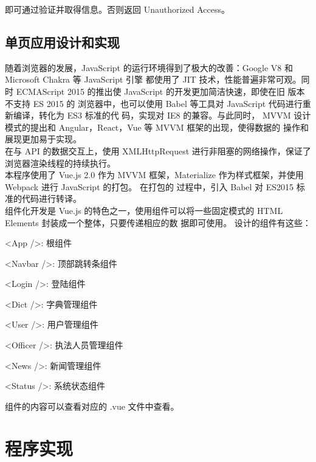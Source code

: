 \documentclass[a4paper, 12pt]{article}
\begin{document}
	即可通过验证并取得信息。否则返回 Unauthorized Access。

	\subsection{\normalfont 单页应用设计和实现}

	随着浏览器的发展，JavaScript 的运行环境得到了极大的改善：Google V8 和 Microsoft Chakra 等 JavaScript 引擎
	都使用了 JIT 技术，性能普遍非常可观。同时 ECMAScript 2015 的推出使 JavaScript 的开发更加简洁快速，即使在旧
	版本不支持 ES 2015 的 浏览器中，也可以使用 Babel 等工具对 JavaScript 代码进行重新编译，转化为 ES3 标准的代
	码，实现对 IE8 的兼容。与此同时， MVVM 设计模式的提出和 Angular，React，Vue 等 MVVM 框架的出现，使得数据的
	操作和展现更加易于实现。 \\

	在与 API 的数据交互上，使用 XMLHttpRequest 进行非阻塞的网络操作，保证了浏览器渲染线程的持续执行。 \\

	本程序使用了 Vue.js 2.0 作为 MVVM 框架，Materialize 作为样式框架，并使用 Webpack 进行 JavaScript 的打包。
	在打包的 过程中，引入 Babel 对 ES2015 标准的代码进行转译。 \\

	组件化开发是 Vue.js 的特色之一，使用组件可以将一些固定模式的 HTML Elements 封装成一个整体，只要传递相应的数
	据即可使用。 设计的组件有这些：

	{
		\begin{enumerate} 
		{\setlength{\parskip}{-0.3em}
			\item {\inlinecode <App />}: 根组件
			\item {\inlinecode <Navbar />}: 顶部跳转条组件
			\item {}: 登陆组件
			\item {\inlinecode <Dict />}: 字典管理组件
			\item {\inlinecode <User /}>: 用户管理组件
			\item {\inlinecode <Officer />}: 执法人员管理组件
			\item {\inlinecode <News />}: 新闻管理组件
			\item {\inlinecode <Status />}: 系统状态组件
		}
		\end{enumerate}
	}

	组件的内容可以查看对应的 .vue 文件中查看。

	\section{\large\textbf 程序实现}
\end{document}
